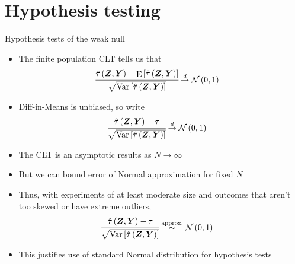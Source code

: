 \documentclass[table, xcolor = {dvipsnames}, 9pt]{beamer}
\theoremstyle{plain}
\DeclareMathOperator{\E}{\rm{E}}
\DeclareMathOperator{\Var}{\rm{Var}}
\begin{document}
\section{Hypothesis testing}
\begin{frame}{Hypothesis tests of the weak null}
\begin{itemize}
\item The finite population CLT tells us that 
\begin{align*}
\cfrac{\hat{\tau}\left(\bm{Z}, \bm{Y}\right) - \E\left[\hat{\tau}\left(\bm{Z}, \bm{Y}\right)\right]}{\sqrt{\Var\left[\hat{\tau}\left(\bm{Z}, \bm{Y}\right)\right]}} & \overset{d}{\to} \mathcal{N}\left(0, 1\right)
\end{align*}  \pause 
\item Diff-in-Means is unbiased, so write
\begin{align*}
\cfrac{\hat{\tau}\left(\bm{Z}, \bm{Y}\right) - \tau}{\sqrt{\Var\left[\hat{\tau}\left(\bm{Z}, \bm{Y}\right)\right]}} & \overset{d}{\to} \mathcal{N}\left(0, 1\right)
\end{align*} \pause
\item The CLT is an asymptotic results as $N \to \infty$
\item But we can bound error of Normal approximation for fixed $N$ \pause
\item Thus, with experiments of at least moderate size and outcomes that aren't too skewed or have extreme outliers,
\begin{align*}
\cfrac{\hat{\tau}\left(\bm{Z}, \bm{Y}\right) - \tau}{\sqrt{\Var\left[\hat{\tau}\left(\bm{Z}, \bm{Y}\right)\right]}} & \overset{\text{approx.}}{\sim} \mathcal{N}\left(0, 1\right)
\end{align*} \pause
\item This justifies use of standard Normal distribution for hypothesis tests
\end{itemize}
\end{frame}
\end{document}
